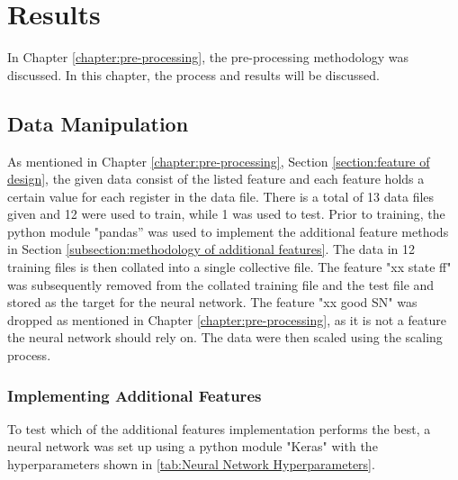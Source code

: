 \documentclass{tum-book}
\begin{document}
\chapter{Results}\label{chapter:results}
In Chapter \ref{chapter:pre-processing}, the pre-processing methodology was discussed. In this chapter, the process and results will be discussed.

    \section{Data Manipulation}\label{section:data manipulation}
    As mentioned in Chapter \ref{chapter:pre-processing}, Section \ref{section:feature of design}, the given data consist of the listed feature and each feature holds a certain value for each register in the data file. There is a total of 13 data files given and 12 were used to train, while 1 was used to test. Prior to training, the python module "pandas”\cite{mckinney-proc-scipy-2010} was used to implement the additional feature methods in Section \ref{subsection:methodology of additional features}. The data in 12 training files is then collated into a single collective file. The feature "xx state ff" was subsequently removed from the collated training file and the test file and stored as the target for the neural network. The feature "xx good SN" was dropped as mentioned in Chapter \ref{chapter:pre-processing}, as it is not a feature the neural network should rely on. The data were then scaled using the scaling process.

        \subsection{Implementing Additional Features}\label{subsection:implementing additional features}
        To test which of the additional features implementation performs the best, a neural network was set up using a python module "Keras"\cite{chollet2015keras} with the hyperparameters shown in \ref{tab:Neural Network Hyperparameters}.  
\end{document}

